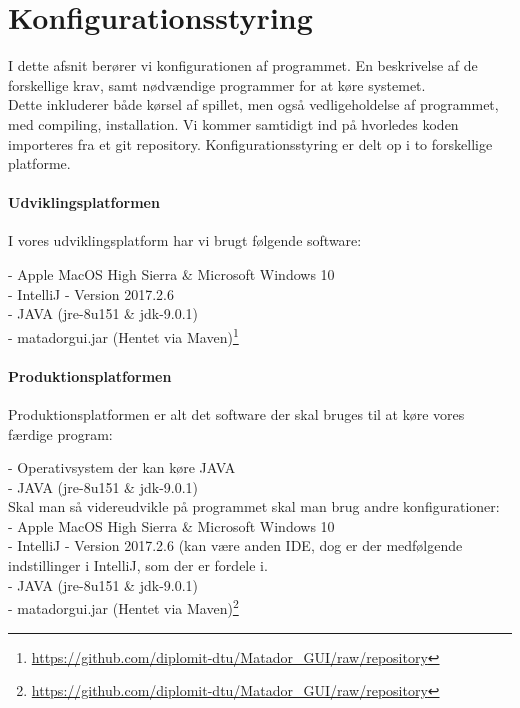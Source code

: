 \chapter{Konfigurationsstyring}

I dette afsnit berører vi konfigurationen af programmet.
En beskrivelse af de forskellige krav, samt nødvændige programmer for at køre systemet. 
\\Dette inkluderer både kørsel af spillet, men også vedligeholdelse af programmet, med compiling, installation.
Vi kommer samtidigt ind på hvorledes koden importeres fra et git repository.
Konfigurationsstyring er delt op i to forskellige platforme. \\

\subsubsection{Udviklingsplatformen}

I vores udviklingsplatform har vi brugt følgende software:

\noindent - Apple MacOS High Sierra \& Microsoft Windows 10 \\
- IntelliJ - Version 2017.2.6 \\
- JAVA (jre-8u151 \& jdk-9.0.1) \\
- matadorgui.jar (Hentet via Maven)\footnote{\url{https://github.com/diplomit-dtu/Matador_GUI/raw/repository}}\\

\subsubsection{Produktionsplatformen}
Produktionsplatformen er alt det software der skal bruges til at køre vores færdige program:

\noindent - Operativsystem der kan køre JAVA\\
- JAVA (jre-8u151 \& jdk-9.0.1) \\

\noindent Skal man så videreudvikle på programmet skal man brug andre konfigurationer:\\
\noindent - Apple MacOS High Sierra \& Microsoft Windows 10 \\
- IntelliJ - Version 2017.2.6 (kan være anden IDE, dog er der medfølgende indstillinger i IntelliJ, som der er fordele i. \\
- JAVA (jre-8u151 \& jdk-9.0.1) \\
- matadorgui.jar (Hentet via Maven)\footnote{\url{https://github.com/diplomit-dtu/Matador_GUI/raw/repository}}\\


